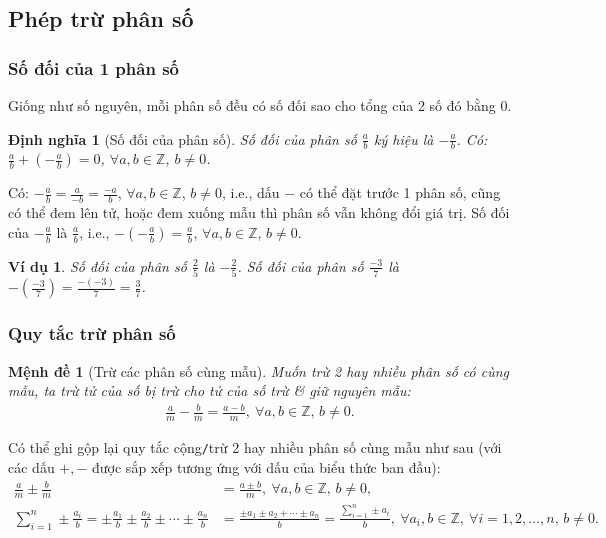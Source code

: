 \documentclass{article}
\newtheorem{dinhnghia}{Định nghĩa}
\newtheorem{menhde}{Mệnh đề}
\newtheorem{vidu}{Ví dụ}
\begin{document}
\subsection{Phép trừ phân số}

\subsubsection{Số đối của 1 phân số}
Giống như số nguyên, mỗi phân số đều có số đối sao cho tổng của 2 số đó bằng 0.

\begin{dinhnghia}[Số đối của phân số]
	\emph{Số đối} của phân số $\frac{a}{b}$ ký hiệu là $-\frac{a}{b}$. Có: $\frac{a}{b} + \left(-\frac{a}{b}\right) = 0$, $\forall a,b\in\mathbb{Z}$, $b\ne0$.
\end{dinhnghia}
Có: $-\frac{a}{b} = \frac{a}{-b} = \frac{-a}{b}$, $\forall a,b\in\mathbb{Z}$, $b\ne0$, i.e., dấu $-$ có thể đặt trước 1 phân số, cũng có thể đem lên tử, hoặc đem xuống mẫu thì phân số vẫn không đổi giá trị. Số đối của $-\frac{a}{b}$ là $\frac{a}{b}$, i.e., $-\left(-\frac{a}{b}\right) = \frac{a}{b}$, $\forall a,b\in\mathbb{Z}$, $b\ne0$.

\begin{vidu}
	Số đối của phân số $\frac{2}{5}$ là $-\frac{2}{5}$. Số đối của phân số $\frac{-3}{7}$ là $-\left(\frac{-3}{7}\right) = \frac{-(-3)}{7} = \frac{3}{7}$.
\end{vidu}

\subsubsection{Quy tắc trừ phân số}

\begin{menhde}[Trừ các phân số cùng mẫu]
	Muốn trừ 2 hay nhiều phân số có cùng mẫu, ta trừ tử của số bị trừ cho tử của số trừ \& giữ nguyên mẫu:
	\begin{align*}
		\frac{a}{m} - \frac{b}{m} = \frac{a - b}{m},\ \forall a,b\in\mathbb{Z},\,b\ne0.
	\end{align*}
\end{menhde}
Có thể ghi gộp lại quy tắc cộng\texttt{/}trừ 2 hay nhiều phân số cùng mẫu như sau (với các dấu $+,-$ được sắp xếp tương ứng với dấu của biểu thức ban đầu):
\begin{align*}
	\frac{a}{m}\pm\frac{b}{m} &= \frac{a\pm b}{m},\ \forall a,b\in\mathbb{Z},\,b\ne0,\\
	\sum_{i=1}^n \pm\frac{a_i}{b} = \pm\frac{a_1}{b}\pm\frac{a_2}{b}\pm\cdots\pm\frac{a_n}{b} &= \frac{\pm a_1\pm a_2 + \cdots\pm a_n}{b} = \frac{\sum_{i=1}^n \pm a_i}{b},\ \forall a_i,b\in\mathbb{Z},\ \forall i = 1,2,\ldots,n,\,b\ne0.
\end{align*}
\end{document}
